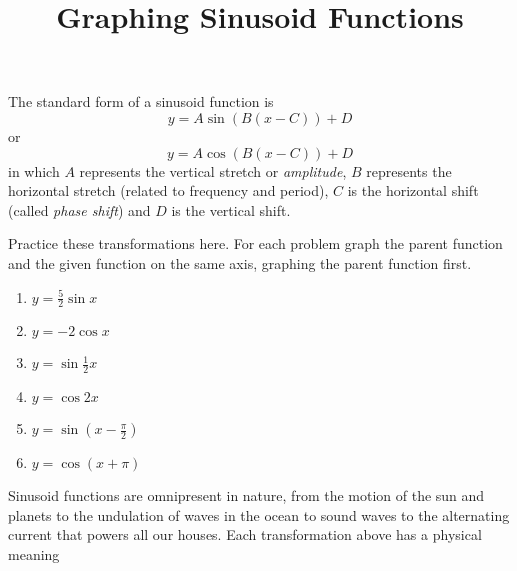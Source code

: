 \documentclass{article}
\begin{document}
\title{Graphing Sinusoid Functions}
\maketitle
\begin{multicols}{2}
The standard form of a sinusoid function is
$$ y = A \sin(B(x-C)) + D $$
or
$$ y = A \cos(B(x-C)) + D $$
in which $A$ represents the vertical stretch or
\textit{amplitude}, $B$ represents the horizontal stretch
(related to frequency and period), $C$ is the horizontal
shift (called \textit{phase shift}) and $D$ is the vertical shift.

Practice these transformations here. For each problem graph
the parent function and the given function on the same axis,
graphing the parent function first.

\begin{enumerate}
	\item $y=\frac52 \sin x$
	\item $y=-2 \cos x$
	\item $y=\sin \frac12 x$
	\item $y=\cos 2x$
	\item $y=\sin(x-\frac{\pi}{2})$
	\item $y=\cos(x+\pi)$
\end{enumerate}

Sinusoid functions are omnipresent in nature, from the motion of the
sun and planets to the undulation of waves in the ocean to sound waves
to the alternating current that powers all our houses. Each transformation above has a physical meaning


\end{multicols}
\end{document}
